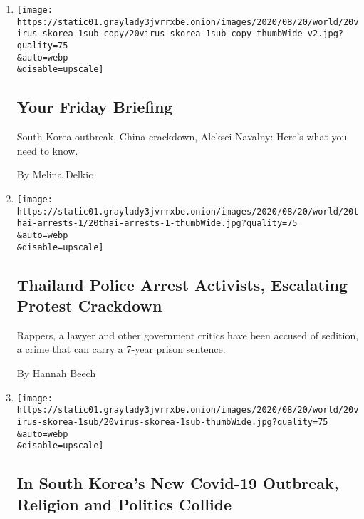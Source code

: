\begin{enumerate}
\def\labelenumi{\arabic{enumi}.}
\item
  \href{/2020/08/20/briefing/south-korea-outbreak-china-crackdown-navalny.html}{}

  \texttt{[image: https://static01.graylady3jvrrxbe.onion/images/2020/08/20/world/20virus-skorea-1sub-copy/20virus-skorea-1sub-copy-thumbWide-v2.jpg?quality=75\\\&auto=webp\\\&disable=upscale]}

  \hypertarget{your-friday-briefing}{%
  \subsection{Your Friday Briefing}\label{your-friday-briefing}}

  South Korea outbreak, China crackdown, Aleksei Navalny: Here's what
  you need to know.

  By Melina Delkic
\item
  \href{/2020/08/20/world/asia/thailand-arrests-protests.html}{}

  \texttt{[image: https://static01.graylady3jvrrxbe.onion/images/2020/08/20/world/20thai-arrests-1/20thai-arrests-1-thumbWide.jpg?quality=75\\\&auto=webp\\\&disable=upscale]}

  \hypertarget{thailand-police-arrest-activists-escalating-protest-crackdown}{%
  \subsection{Thailand Police Arrest Activists, Escalating Protest
  Crackdown}\label{thailand-police-arrest-activists-escalating-protest-crackdown}}

  Rappers, a lawyer and other government critics have been accused of
  sedition, a crime that can carry a 7-year prison sentence.

  By Hannah Beech
\item
  \href{/2020/08/20/world/asia/coronavirus-south-korea-church-sarang-jeil.html}{}

  \texttt{[image: https://static01.graylady3jvrrxbe.onion/images/2020/08/20/world/20virus-skorea-1sub/20virus-skorea-1sub-thumbWide.jpg?quality=75\\\&auto=webp\\\&disable=upscale]}

  \hypertarget{in-south-koreas-new-covid-19-outbreak-religion-and-politics-collide}{%
  \subsection{In South Korea's New Covid-19 Outbreak, Religion and
  Politics
  Collide}\label{in-south-koreas-new-covid-19-outbreak-religion-and-politics-collide}}


\end{enumerate}
